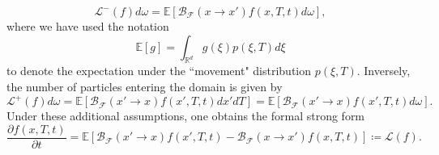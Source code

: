 \documentclass[10pt,a4paper]{article}
\theoremstyle{theorem}
\numberwithin{equation}{section}
\begin{document}
\begin{equation}
\label{eq:Lf-}
\mathcal{L}^-(f)d\omega=\mathbb{E}\left[\mathcal{B}_\mathcal{F}(x\rightarrow x')f(x,T,t)d\omega\right],
\end{equation}
where we have used the notation
\begin{equation}
\mathbb{E}\left[ g \right]=\int_{\mathbb{R}^d}g(\xi)p(\xi,T)d\xi
\end{equation}
to denote the expectation under the ``movement" distribution $p(\xi,T)$. Inversely, the number of particles entering the domain is given by
\begin{equation}
\label{eq:Lf+}
\mathcal{L}^+(f)d\omega=\mathbb{E}\left[\mathcal{B}_\mathcal{F}(x'\rightarrow x)f(x',T,t)dx'dT\right]
=\mathbb{E}\left[\mathcal{B}_\mathcal{F}(x'\rightarrow x)f(x',T,t)d\omega\right].
\end{equation}
Under these additional assumptions, one obtains the formal strong form
\begin{equation}
\label{eq:SAStrong}
\frac{\partial f(x,T,t)}{\partial t}=\mathbb{E}\left[\mathcal{B}_\mathcal{F}(x'\rightarrow x)f(x',T,t)-\mathcal{B}_\mathcal{F}(x\rightarrow x')f(x,T,t)\right]\coloneqq\mathcal{L}(f).
\end{equation}
\end{document}
